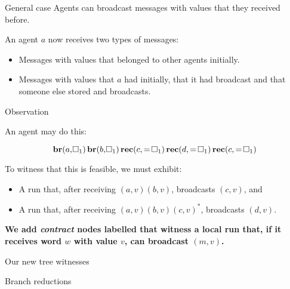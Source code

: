 \documentclass{beamer}
\newcommand{\br}{\mathbf{br}}
\newcommand{\rec}{\mathbf{rec}}
\newcommand{\reg}{\hspace{-0.5mm}\square}
\begin{document}
\begin{frame}{General case}
	Agents can broadcast messages with values that they received before.
	\vspace{0.5cm}
	
	An agent $a$ now receives two types of messages:
	\begin{itemize}
		\item Messages with values that belonged to other agents initially.
		
		\item Messages with values that $a$ had initially, that it had broadcast and that someone else stored and broadcasts.  
	\end{itemize}
\end{frame}

\begin{frame}{Observation}
	
	An agent may do this:
	
	\[ \br(a, \reg_1) \, \br(b, \reg_1) \, \rec(c, =\reg_1)  \,\rec(d, =\reg_1) \, \rec(c, =\reg_1)\]
	\pause
	
	To witness that this is feasible, we must exhibit: 
	\begin{itemize}
		\item A run that, after receiving $(a, v) (b, v)$, broadcasts $(c,v)$, and
		
		\item A run that, after receiving $(a,v) (b,v) (c,v)^*$, broadcasts $(d,v)$.
	\end{itemize}
\vspace{0.5cm}

	\pause
	\textbf{We add \emph{contract} nodes labelled  that witness a local run that, if it receives word $w$ with value $v$, can broadcast $(m,v)$.}
\end{frame}

\begin{frame}{Our new tree witnesses}
	
	
	
\end{frame}


\begin{frame}{Branch reductions}
	\begin{columns}
		\begin{column}{0.5\textwidth}
			
		\end{column}
		
		\begin{column}{0.5\textwidth}
			
		\end{column}
	\end{columns}
	
\end{frame}
\end{document}
